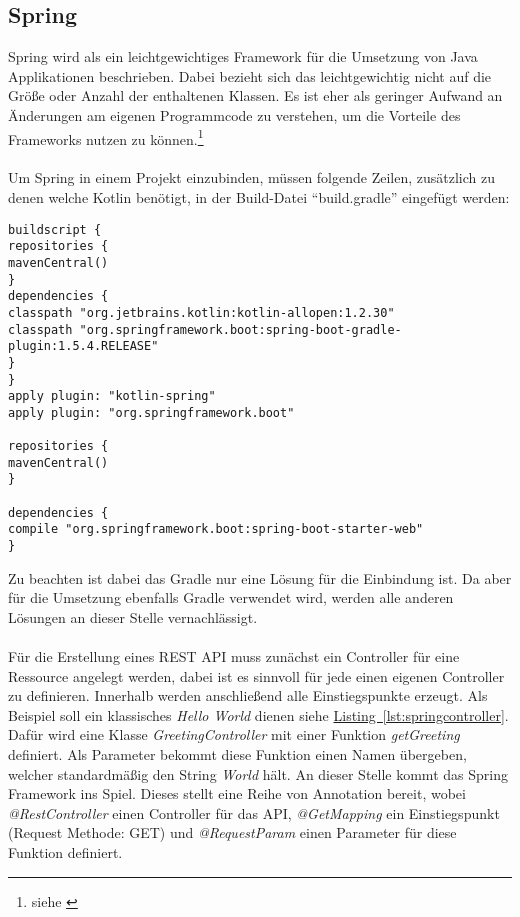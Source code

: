 \subsection{Spring}\label{sec:bibspring}
Spring wird als ein leichtgewichtiges Framework für die Umsetzung von Java Applikationen beschrieben. Dabei bezieht sich das leichtgewichtig nicht auf die Größe oder Anzahl der enthaltenen Klassen. Es ist eher als geringer Aufwand an Änderungen am eigenen Programmcode zu verstehen, um die Vorteile des Frameworks nutzen zu können.\footnote{siehe \cite{proSpring5}}\\
\\
Um Spring in einem Projekt einzubinden, müssen folgende Zeilen, zusätzlich zu denen welche Kotlin benötigt, in der Build-Datei \enquote{build.gradle} eingefügt werden:
\begin{lstlisting}[style=lstStyleFramed, caption={Einbindung des Spring Framework mithilfe von Gradle}]
buildscript {
repositories {
mavenCentral()
}
dependencies {
classpath "org.jetbrains.kotlin:kotlin-allopen:1.2.30"
classpath "org.springframework.boot:spring-boot-gradle-plugin:1.5.4.RELEASE"
}
}
apply plugin: "kotlin-spring"
apply plugin: "org.springframework.boot"

repositories {
mavenCentral()
}

dependencies {
compile "org.springframework.boot:spring-boot-starter-web"
}
\end{lstlisting}
Zu beachten ist dabei das Gradle nur eine Lösung für die Einbindung ist. Da aber für die Umsetzung ebenfalls Gradle verwendet wird, werden alle anderen Lösungen an dieser Stelle vernachlässigt.\\
\\ 
Für die Erstellung eines \gls{REST} \gls{API} muss zunächst ein Controller für eine Ressource angelegt werden, dabei ist es sinnvoll für jede einen eigenen Controller zu definieren. Innerhalb werden anschließend alle Einstiegspunkte erzeugt. Als Beispiel soll ein klassisches \textit{Hello World} dienen siehe \hyperref[lst:springcontroller]{Listing~\ref{lst:springcontroller}}. Dafür wird eine Klasse \textit{GreetingController} mit einer Funktion \textit{getGreeting} definiert. Als Parameter bekommt diese Funktion einen Namen übergeben, welcher standardmäßig den String \textit{World} hält. An dieser Stelle kommt das Spring Framework ins Spiel. Dieses stellt eine Reihe von Annotation bereit, wobei \textit{@RestController} einen Controller für das \gls{API}, \textit{@GetMapping} ein Einstiegspunkt (Request Methode: GET) und \textit{@RequestParam} einen Parameter für diese Funktion definiert. 
